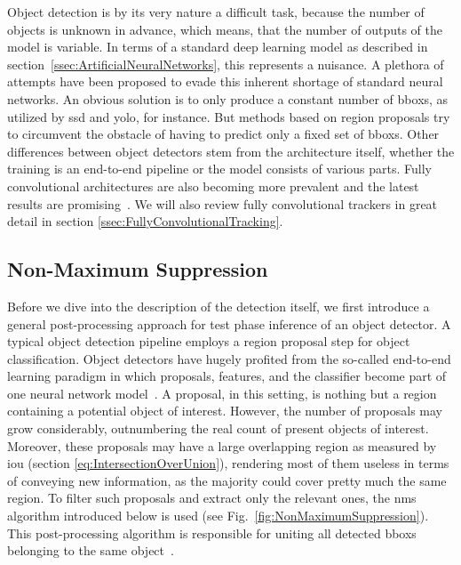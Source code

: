 Object detection is by its very nature a difficult task, because the number of objects is unknown in advance, which means, that the number of outputs of the model is variable. In terms of a standard deep learning model as described in section~\ref{ssec:ArtificialNeuralNetworks}, this represents a nuisance. A plethora of attempts have been proposed to evade this inherent shortage of standard neural networks. An obvious solution is to only produce a constant number of \glspl{bbox}, as utilized by \gls{ssd} and \gls{yolo}, for instance. But methods based on region proposals try to circumvent the obstacle of having to predict only a fixed set of \glspl{bbox}. Other differences between object detectors stem from the architecture itself, whether the training is an end-to-end pipeline or the model consists of various parts. Fully convolutional architectures are also becoming more prevalent and the latest results are promising~\cite{Tian2019}. We will also review fully convolutional trackers in great detail in section \ref{ssec:FullyConvolutionalTracking}.

\subsection{Non-Maximum Suppression}
\label{ssec:NonMaximumSuppression}

Before we dive into the description of the detection itself, we first introduce a general post-processing approach for test phase inference of an object detector. A typical object detection pipeline employs a region proposal step for object classification. Object detectors have hugely profited from the so-called end-to-end learning paradigm in which proposals, features, and the classifier become part of one neural network model~\cite{Hosang2017}. A proposal, in this setting, is nothing but a region containing a potential object of interest. However, the number of proposals may grow considerably, outnumbering the real count of present objects of interest. Moreover, these proposals may have a large overlapping region as measured by \gls{iou} (section \ref{eq:IntersectionOverUnion}), rendering most of them useless in terms of conveying new information, as the majority could cover pretty much the same region. To filter such proposals and extract only the relevant ones, the \gls{nms} algorithm introduced below is used (see Fig.~\ref{fig:NonMaximumSuppression}). This post-processing algorithm is responsible for uniting all detected \glspl{bbox} belonging to the same object~\cite{Hosang2017}.

